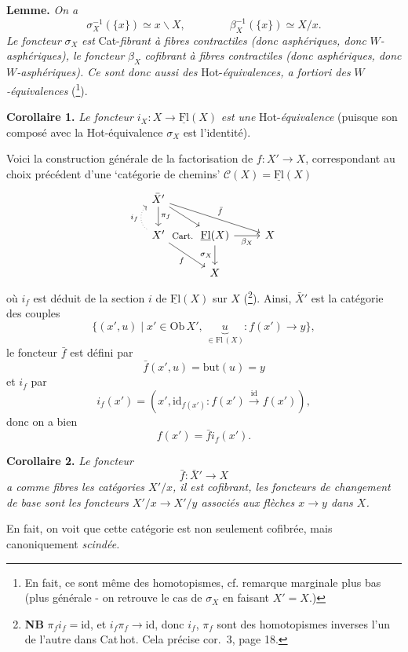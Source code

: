 \documentclass[11pt]{article}
\newcommand{\printedpage}[1]{\marginpar{\footnotesize p.~#1}}
\newcommand{\msp}[1]{\marginpar{\footnotesize [#1]}}
\newcommand{\cat}[1]{\underline{\mathrm{#1}}}
\begin{document}
\msp{page 17}
\textbf{Lemme.} \textit{On a}
\[
\sigma_X^{-1}(\{x\}) \simeq x\backslash X, \qquad\qquad \beta_X^{-1}(\{x\}) \simeq X/x.
\]
\textit{Le foncteur} $\sigma_X$ \textit{est} Cat-\textit{fibrant à fibres contractiles (donc asphériques, donc} $W$\textit{-asphériques), le foncteur} $\beta_X$ \textit{cofibrant à fibres contractiles (donc asphériques, donc} $W$\textit{-asphériques). Ce sont donc aussi des} Hot-\textit{équivalences, a fortiori des} $W$\textit{-équivalences} (\footnote{En fait, ce sont même des homotopismes, cf. remarque marginale plus bas (plus générale - on retrouve le cas de $\sigma_X$ en faisant $X' = X$.)}).

\textbf{Corollaire 1.} \textit{Le foncteur} $i_X : X \longrightarrow \cat{Fl}(X)$ \textit{est une} Hot-\textit{équivalence} (puisque son composé avec la Hot-équivalence $\sigma_X$ est l'identité).

\printedpage{11}
Voici la construction générale de la factorisation de $f : X' \longrightarrow X$, correspondant au choix précédent d'une `catégorie de chemins' $\mathcal{C}(X) = \cat{Fl}(X)$
\[
\begin{tikzcd}
\bar{X}' \arrow[d, "\pi_f"] \arrow[rd] \arrow[rrd, "\bar{f}"] & & \\
X' \arrow[u, dotted, bend left=60, "i_f"] \arrow[rd, "f"'] \arrow[r, phantom, "\text{\footnotesize Cart.}"] & \cat{Fl}(X) \arrow[r, "\beta_X"'] \arrow[d, "\sigma_X"'] & X \\
& X &
\end{tikzcd}
\]
où $i_f$ est déduit de la section $i$ de $\cat{Fl}(X)$ sur $X$ (\footnote{\textbf{NB} $\pi_f i_f = \mathrm{id}$, et $i_f\pi_f \longrightarrow \mathrm{id}$, donc $i_f$, $\pi_f$ sont des homotopismes inverses l'un de l'autre dans Cat\,hot. Cela précise cor.~3, page 18.}). Ainsi, $\bar{X}'$ est la catégorie des couples
\[
\{(x',u) \mid x' \in \mathrm{Ob}\,X',\ \underbrace{u}_{\in\mathrm{Fl}\,(X)} : f(x') \longrightarrow y\},
\]
le foncteur $\bar{f}$ est défini par
\[
\bar{f}(x',u) = \mathrm{but}(u) = y
\]
et $i_f$ par
\[
i_f(x') = (x', \mathrm{id}_{f(x')} : f(x') \xrightarrow{\mathrm{id}} f(x')),
\]
donc on a bien
\[
f(x') = \bar{f} i_f(x').
\]

\msp{page 18}
\textbf{Corollaire 2.} \textit{Le foncteur}
\[
\bar{f} : \bar{X}' \longrightarrow X
\]
\textit{a comme fibres les catégories $X'/x$, il est cofibrant, les foncteurs de changement de base sont les foncteurs $X'/x \longrightarrow X'/y$ associés aux flèches $x \longrightarrow y$ dans $X$.}

En fait, on voit que cette catégorie est non seulement cofibrée, mais canoniquement \textit{scindée.}
\end{document}
